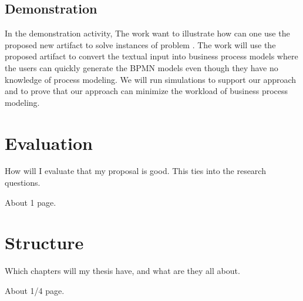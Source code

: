 \subsection{Demonstration}
In the demonstration activity, The work want to illustrate how can one use the proposed new artifact to solve instances of problem \cite{DSM_3}. The work will use the proposed artifact to convert the textual input into business process models where the users can quickly generate the BPMN models even though they have no knowledge of process modeling. We will run simulations to support our approach and to prove that our approach can minimize the workload of business process modeling.

\section{Evaluation}
\label{sec:intro:ev}

How will I evaluate that my proposal is good. This ties into the research questions.

About 1 page.

\section{Structure}
\label{sec:intro:struct}

Which chapters will my thesis have, and what are they all about.

About 1/4 page.
